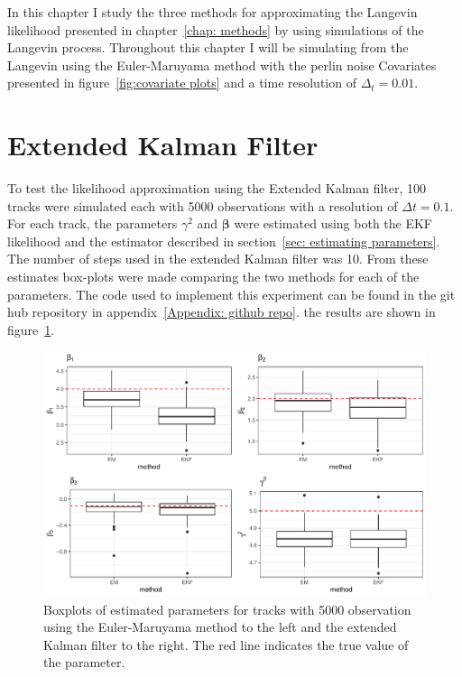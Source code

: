 


In this chapter I study the three methods for approximating the Langevin likelihood presented in chapter~\ref{chap: methods} by using simulations of the Langevin process. Throughout this chapter I will be simulating from the Langevin using the Euler-Maruyama method with the perlin noise Covariates presented in figure~\ref{fig:covariate plots} and a time resolution of $\Delta_t =0.01$.




\section{Extended Kalman Filter}
\label{sec: EKF test}
To test the likelihood approximation using the Extended Kalman filter, 100 tracks were simulated each with 5000 observations with a resolution of $\Delta t = 0.1$. For each track, the parameters $\gamma^2$ and $\bm \beta$ were estimated using both the EKF likelihood and the estimator described in section~\ref{sec: estimating parameters}. The number of steps used in the extended Kalman filter was 10. From these estimates box-plots were made comparing the two methods for each of the parameters. The code used to implement this experiment can be found in the git hub repository in appendix~\ref{Appendix: github repo}. the results are shown in figure~\ref{fig:EKF_thin_boxplot}.

 

\begin{figure}[H]
    \centering
    \includegraphics[width=\linewidth]{Images/Results/EM EKF plot.pdf}
    \caption[Euler-Maruyama and extended Kalman filter estimates]{Boxplots of estimated parameters for tracks with 5000 observation using the Euler-Maruyama method to the left and the extended Kalman filter to the right. The red line indicates the true value of the parameter.}
    \label{fig:EKF_thin_boxplot}
\end{figure}

